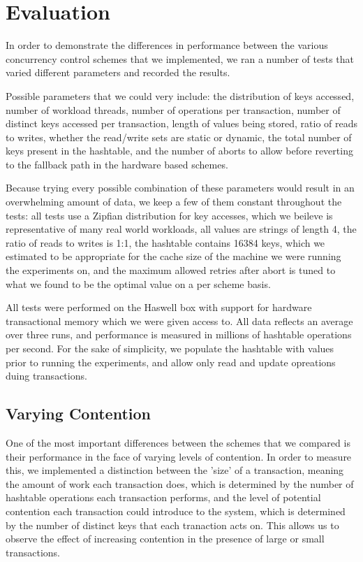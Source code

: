 \section{Evaluation} \label{sec:eval}

In order to demonstrate the differences in performance between the various 
concurrency control schemes that we implemented, we ran a number of tests 
that varied different parameters and recorded the results.

Possible parameters that we could very include: the distribution of keys 
accessed, number of workload threads, number of operations per transaction, 
number of distinct keys accessed per transaction, length of values being 
stored, ratio of reads to writes, whether the read/write sets are static 
or dynamic, the total number of keys present in the hashtable, and the number 
of aborts to allow before reverting to the fallback path in the hardware 
based schemes.

Because trying every possible combination of these parameters would result in 
an overwhelming amount of data, we keep a few of them constant throughout the 
tests: all tests use a Zipfian distribution for key accesses, which we beileve 
is representative of many real world workloads, all values are strings of length 
4, the ratio of reads to writes is 1:1, the hashtable contains 16384 keys, which 
we estimated to be appropriate for the cache size of the machine we were running 
the experiments on, and the maximum allowed retries after 
abort is tuned to what we found to be the optimal value on a per scheme basis.

All tests were performed on the Haswell box with support for hardware 
transactional memory which we were given access to. All data reflects an 
average over three runs, and performance is measured in millions of hashtable 
operations per second. For the sake of simplicity, we populate the hashtable 
with values prior to running the experiments, and allow only read and update 
opreations duing transactions.

\subsection{Varying Contention}

One of the most important differences between the schemes that we compared is 
their performance in the face of varying levels of contention. In order to 
measure this, we implemented a distinction between the 'size' of a transaction, 
meaning the amount of work each transaction does, which is determined by the 
number of hashtable operations each transaction performs,  and the level of 
potential contention each transaction could introduce to the system, which is 
determined by the number of distinct keys that each tranaction acts on. This 
allows us to observe the effect of increasing contention in the presence of 
large or small transactions.

